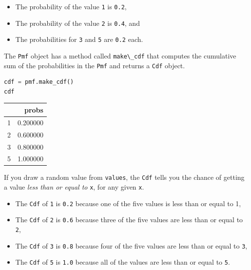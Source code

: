 \begin{itemize}
\item
  The probability of the value \passthrough{\lstinline!1!} is
  \passthrough{\lstinline!0.2!},
\item
  The probability of the value \passthrough{\lstinline!2!} is
  \passthrough{\lstinline!0.4!}, and
\item
  The probabilities for \passthrough{\lstinline!3!} and
  \passthrough{\lstinline!5!} are \passthrough{\lstinline!0.2!} each.
\end{itemize}

The \passthrough{\lstinline!Pmf!} object has a method called
\passthrough{\lstinline!make\_cdf!} that computes the cumulative sum of
the probabilities in the \passthrough{\lstinline!Pmf!} and returns a
\passthrough{\lstinline!Cdf!} object.

\begin{lstlisting}[language=Python,style=source]
cdf = pmf.make_cdf()
cdf
\end{lstlisting}

\begin{tabular}{lr}
\midrule
 & probs \\
\midrule
1 & 0.200000 \\
2 & 0.600000 \\
3 & 0.800000 \\
5 & 1.000000 \\
\midrule
\end{tabular}

If you draw a random value from \passthrough{\lstinline!values!}, the
\passthrough{\lstinline!Cdf!} tells you the chance of getting a value
\emph{less than or equal to} \passthrough{\lstinline!x!}, for any given
\passthrough{\lstinline!x!}.

\begin{itemize}
\item
  The \passthrough{\lstinline!Cdf!} of \passthrough{\lstinline!1!} is
  \passthrough{\lstinline!0.2!} because one of the five values is less
  than or equal to 1,
\item
  The \passthrough{\lstinline!Cdf!} of \passthrough{\lstinline!2!} is
  \passthrough{\lstinline!0.6!} because three of the five values are
  less than or equal to \passthrough{\lstinline!2!},
\item
  The \passthrough{\lstinline!Cdf!} of \passthrough{\lstinline!3!} is
  \passthrough{\lstinline!0.8!} because four of the five values are less
  than or equal to \passthrough{\lstinline!3!},
\item
  The \passthrough{\lstinline!Cdf!} of \passthrough{\lstinline!5!} is
  \passthrough{\lstinline!1.0!} because all of the values are less than
  or equal to \passthrough{\lstinline!5!}.
\end{itemize}

